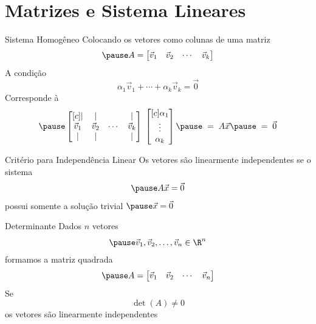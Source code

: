 \documentclass[fleqn,aspectratio=169,12pt]{beamer}
\begin{document}





\section{Matrizes e Sistema Lineares}

\begin{frame}{Sistema Homogêneo}
  Colocando os vetores como colunas de uma matriz
  \[
    \pause
    A =
    \begin{bmatrix}
      \vec{v}_1 & \vec{v}_2 & \cdots & \vec{v}_k
    \end{bmatrix}
  \]
  \pause
  A condição
  \[
    \alpha_1\vec{v}_1 + \cdots + \alpha_k\vec{v}_k = \vec{0}
  \]
  \pause
  Corresponde à
  \[
    \pause
    \begin{bmatrix}[c]
      |         & |         &        & |         \\
      \vec{v}_1 & \vec{v}_2 & \cdots & \vec{v}_k \\
      |         & |         &        & |
    \end{bmatrix} \;
    \begin{bmatrix}[c]
      \alpha_1 \\
      \vdots   \\
      \alpha_k
    \end{bmatrix}
    \pause
    \;=\; A \vec{x}
    \pause
    \;=\; \vec{0}
  \]
\end{frame}

\begin{frame}{Critério para Independência Linear}
  Os vetores são linearmente independentes
  \pause
  se o sistema
  \[
    \pause
    A\vec{x} = \vec{0}
  \]
  \pause
  possui somente a solução trivial
  \(
    \pause
    \vec{x} = \vec{0}
  \)
\end{frame}

\begin{frame}{Determinante}
  Dados $n$ vetores
  \[
    \pause
    \vec{v}_1, \vec{v}_2, \ldots, \vec{v}_n \in \R^n
  \]
  \pause
  formamos a matriz quadrada
  \[
    \pause
    A =
    \begin{bmatrix}
      \vec{v}_1 & \vec{v}_2 & \cdots & \vec{v}_n
    \end{bmatrix}
  \]
  \pause
  Se
  \[
    \det(A) \neq 0
  \]
  \pause
  os vetores são linearmente independentes
\end{frame}
\end{document}
